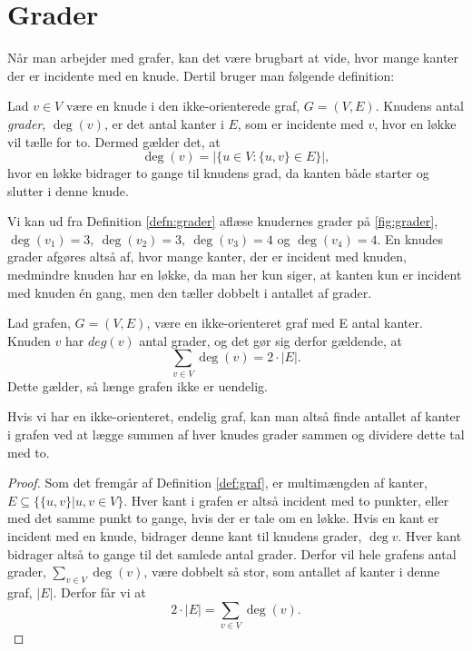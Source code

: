 \section{Grader} \label{sec:grader}
Når man arbejder med grafer, kan det være brugbart at vide, hvor mange kanter der er incidente med en knude. Dertil bruger man følgende definition:

\begin{defn}[Grader] \label{defn:grader}
Lad $v \in V$ være en knude i den ikke-orienterede graf, $G = (V,E)$. Knudens antal \emph{grader}, $\deg(v)$, er det antal kanter i $E$, som er incidente med $v$, hvor en løkke vil tælle for to. Dermed gælder det, at
\begin{equation}
\deg(v)=|\{u \in V: \{u,v\} \in E \}|,
\end{equation}
hvor en løkke bidrager to gange til knudens grad, da kanten både starter og slutter i denne knude.
\end{defn}

\begin{exmp} \label{ex:grader}

Vi kan ud fra Definition \ref{defn:grader} aflæse knudernes grader på \autoref{fig:grader}, $\deg(v_{1})=3, \ \deg(v_{2})=3, \ \deg(v_{3})=4$ og $\deg(v_{4})=4$. En knudes grader afgøres altså af, hvor mange kanter, der er incident med knuden, medmindre knuden har en løkke, da man her kun siger, at kanten kun er incident med knuden én gang, men den tæller dobbelt i antallet af grader.


\end{exmp}

\begin{thm}
Lad grafen, $G = (V,E)$, være en ikke-orienteret graf med E antal kanter. Knuden $v$ har $deg(v)$ antal grader, og det gør sig derfor gældende, at
\begin{equation}
	\sum_{v \in V} { } \deg(v) = 2 \cdot |E|.
\end{equation}
Dette gælder, så længe grafen ikke er uendelig.
\end{thm}
Hvis vi har en ikke-orienteret, endelig graf, kan man altså finde antallet af kanter i grafen ved at lægge summen af hver knudes grader sammen og dividere dette tal med to.

\begin{proof}
Som det fremgår af Definition \ref{def:graf}, er multimængden af kanter, $E \subseteq \{\{u,v\}|u,v \in V \}$. Hver kant i grafen er altså incident med to punkter, eller med det samme punkt to gange, hvis der er tale om en løkke. Hvis en kant er incident med en knude, bidrager denne kant til knudens grader, $\deg{v}$. Hver kant bidrager altså to gange til det samlede antal grader. Derfor vil hele grafens antal grader, $\sum_{v \in V} { } \deg(v)$, være dobbelt så stor, som antallet af kanter i denne graf, $|E|$. Derfor får vi at 
\begin{equation}
2 \cdot |E|= \sum_{v \in V} { } \deg(v).
\end{equation} 
\end{proof}
